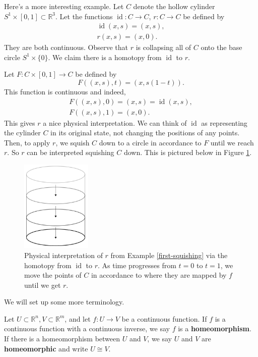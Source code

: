 \documentclass{amsart}
\DeclareMathOperator{\id}{id}
\begin{document}
\begin{example}\label{first-squishing}
    Here's a more interesting example. Let \(C\) denote the hollow cylinder
	 \(S^1\times [0, 1]\subset\mathbb{R}^3\). Let the functions \(\id:
	 C\to C\), \(r:C\to C\) be defined by 
	 \begin{align*}
	    \id(x, s) = (x, s),\\
		 r(x, s) = (x, 0).
	 \end{align*}
	 They are both continuous. 
	 Observe that \(r\) is collapsing all of \(C\) onto the base circle
	 \(S^1\times\{0\}\). We claim there is a homotopy from \(\id\) to \(r\).

	 Let \(F: C\times [0, 1]\to C\) be defined by 
	 \[
	    F((x, s), t) = (x, s(1-t)).
	 \] 
	 This function is continuous and indeed, 
	 \begin{align*}
		 F((x, s), 0) =
		 (x, s) = \id(x, s),\\
		 F((x, s), 1) = (x, 0).
	 \end{align*}
	 This gives \(r\) a nice physical interpretation. We can think of \(\id\) as
	 representing the cylinder \(C\) in its original state, not changing the
	 positions of any points. Then, to apply \(r\), we squish \(C\) down to a
	 circle in accordance to \(F\) until we reach \(r\). So \(r\) can be
	 interpreted squishing \(C\) down. This is pictured below in Figure
	 \ref{squishing}.
	 \begin{figure}[!h]
		 \centering
		 \includegraphics[width = 0.3\textwidth]{Inkscape Files/squishing.png}
		 \caption{Physical interpretation of \(r\) from Example
		 \ref{first-squishing} via the homotopy from \(\id\)
		 to \(r\). As time progresses from \(t=0\) to \(t=1\), we move the points
		 of \(C\) in accordance to where they are mapped by \(f\) until we get
		 \(r\).}
		 \label{squishing}
	 \end{figure}
\end{example}

We will set up some more terminology.
\begin{definition}
	Let \(U\subset\mathbb{R}^n, V\subset\mathbb{R}^m\), and let \(f: U\to V\) be a
	continuous function. If \(f\) is a  
	continuous function with a continuous inverse, we say \(f\) is a
	\textbf{homeomorphism}. If there is a homeomorphism
	between \(U\) and \(V\), we say \(U\) and \(V\) are \textbf{homeomorphic}
	and write \(U\cong V\).
\end{definition}
\end{document}
